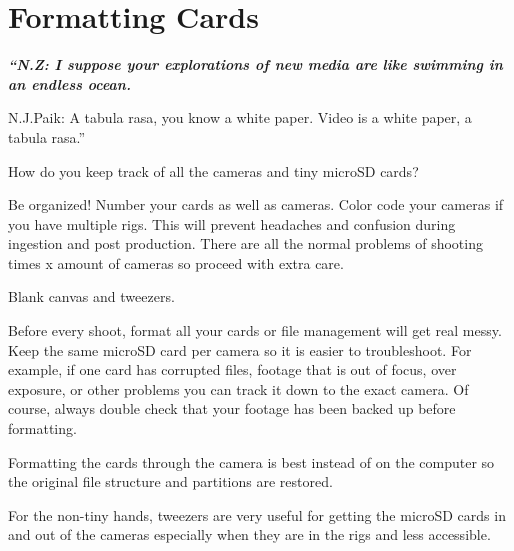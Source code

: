 \chapter{Formatting Cards}
\pagecolor{white}
\label{chap:4}
\begin{fullwidth}


{\itshape\bfseries “N.Z: I suppose your explorations of new media are like swimming in an endless ocean. 

N.J.Paik: A tabula rasa, you know a white paper. Video is a white paper, a tabula rasa.”}

\vspace{\baselineskip}

\problem

{\large How do you keep track of all the cameras and tiny microSD cards? \par}

Be organized! Number your cards as well as cameras. Color code your cameras if you have multiple rigs. This will prevent headaches and confusion during ingestion and post production. There are all the normal problems of shooting times x amount of cameras so proceed with extra care. 


\solution

{\large Blank canvas and tweezers. \par}

Before every shoot, format all your cards or file management will get real messy. Keep the same microSD card per camera so it is easier to troubleshoot. For example, if one card has corrupted files, footage that is out of focus, over exposure, or other problems you can track it down to the exact camera. Of course, always double check that your footage has been backed up before formatting. 

Formatting the cards through the camera is best instead of on the computer so the original file structure and partitions are restored. 


\tip For the non-tiny hands, tweezers are very useful for getting the microSD cards in and out of the cameras especially when they are in the rigs and less accessible. 



\clearpage
\end{fullwidth}
